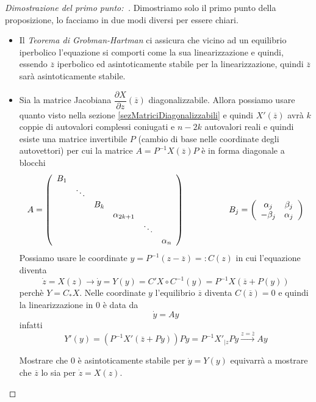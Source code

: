 \documentclass[11pt,a4paper,twoside]{book}
\newenvironment{dimo}[1][\proofname]{
	\begin{tcolorbox}[
	breakable, 
	enhanced, 
	interior hidden, 
	frame hidden, 
	borderline west = {1pt}{0pt}{gray}, 
	top=0pt, bottom=0pt, left=0pt]
\begin{proof}[#1:~]
}
{
\end{proof}
\end{tcolorbox}
}
\theoremstyle{esss}
\theoremstyle{dotless}
\numberwithin{equation}{section} %
\begin{document}
\begin{dimo}[Dimostrazione del primo punto]
Dimostriamo solo il primo punto della proposizione, lo facciamo in due modi diversi per essere chiari.
\begin{itemize}
\item Il \textit{Teorema di Grobman-Hartman} ci assicura che vicino ad un equilibrio iperbolico l'equazione si comporti come la sua linearizzazione e quindi, essendo $\overline{z}$ iperbolico ed asintoticamente stabile per la linearizzazione, quindi $\overline{z}$ sarà asintoticamente stabile.
\item Sia la matrice Jacobiana $\dfrac{\partial X}{\partial z}(\overline{z})$ diagonalizzabile. Allora possiamo usare quanto visto nella sezione \ref{sezMatriciDiagonalizzabili} e quindi $X'(\overline{z})$ avrà $k$ coppie di autovalori complessi coniugati e $n-2k$ autovalori reali e quindi esiste una matrice invertibile $P$ (cambio di base nelle coordinate degli autovettori) per cui la matrice $A=P^{-1}X(\overline{z})P$ è in forma diagonale a blocchi
\[
A=\left(\begin{array}{cccccc}
B_1 & & & & & \\
 & \ddots  & & & & \\
 &  & B_k & & & \\
 &  & & \alpha_{2k+1} & & \\
 &  & & & \ddots & \\
 &  & & & & \alpha_{n} \\
\end{array}\right) \hspace{0.15\linewidth}
B_j=\left(\begin{array}{cc}
\alpha_j & \beta_j \\
-\beta_j & \alpha_j
\end{array}\right)
\]
Possiamo usare le coordinate $y=P^{-1}(z-\overline{z})=:C(z)$ in cui l'equazione diventa
\[
\dot{z}=X(z) \rightarrow \dot{y}=Y(y)=C'X\circ C^{-1}(y) = P^{-1}X\left(\overline{z}+P(y)\right)
\]
perchè $Y=C_*X$. Nelle coordinate $y$ l'equilibrio $\overline{z}$ diventa $C(\overline{z})=0$ e quindi la linearizzazione in $0$ è data da 
\[
\dot{y}=Ay
\]
infatti \[
Y'(y)=\left( P^{-1} X' (\overline{z}+Py) \right) Py = P^{-1} X'_{|z} P y \overset{z=\overline{z}}{\longrightarrow} A y
\]

Mostrare che $0$ è asintoticamente stabile per $\dot{y}=Y(y)$ equivarrà a mostrare che $\overline{z}$ lo sia per $\dot{z}=X(z)$.


\end{itemize}
\end{dimo}
\end{document}
